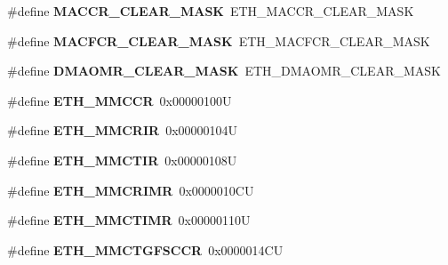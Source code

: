 \begin{DoxyCompactItemize}
\#define {\bfseries M\+A\+C\+C\+R\+\_\+\+C\+L\+E\+A\+R\+\_\+\+M\+A\+SK}~E\+T\+H\+\_\+\+M\+A\+C\+C\+R\+\_\+\+C\+L\+E\+A\+R\+\_\+\+M\+A\+SK
\item 
\mbox{\label{group___h_a_l___e_t_h___aliased___defines_ga0fc15b5e25134974f3a371c17882e36d}} 
\#define {\bfseries M\+A\+C\+F\+C\+R\+\_\+\+C\+L\+E\+A\+R\+\_\+\+M\+A\+SK}~E\+T\+H\+\_\+\+M\+A\+C\+F\+C\+R\+\_\+\+C\+L\+E\+A\+R\+\_\+\+M\+A\+SK
\item 
\mbox{\label{group___h_a_l___e_t_h___aliased___defines_gad1b188dfe2cdaea68fb36806a0b94b95}} 
\#define {\bfseries D\+M\+A\+O\+M\+R\+\_\+\+C\+L\+E\+A\+R\+\_\+\+M\+A\+SK}~E\+T\+H\+\_\+\+D\+M\+A\+O\+M\+R\+\_\+\+C\+L\+E\+A\+R\+\_\+\+M\+A\+SK
\item 
\mbox{\label{group___h_a_l___e_t_h___aliased___defines_ga340605767fdf406c393f046be44a1e09}} 
\#define {\bfseries E\+T\+H\+\_\+\+M\+M\+C\+CR}~0x00000100U
\item 
\mbox{\label{group___h_a_l___e_t_h___aliased___defines_gaa49af339607e5c30c69d55f4941fd775}} 
\#define {\bfseries E\+T\+H\+\_\+\+M\+M\+C\+R\+IR}~0x00000104U
\item 
\mbox{\label{group___h_a_l___e_t_h___aliased___defines_gab53a2a3649b1b96533c3bb8f2dfca221}} 
\#define {\bfseries E\+T\+H\+\_\+\+M\+M\+C\+T\+IR}~0x00000108U
\item 
\mbox{\label{group___h_a_l___e_t_h___aliased___defines_ga42e63a205698925c20f69be3d711ae59}} 
\#define {\bfseries E\+T\+H\+\_\+\+M\+M\+C\+R\+I\+MR}~0x0000010\+CU
\item 
\mbox{\label{group___h_a_l___e_t_h___aliased___defines_gad0e2ddcc50c96772130c9717aa1ec496}} 
\#define {\bfseries E\+T\+H\+\_\+\+M\+M\+C\+T\+I\+MR}~0x00000110U
\item 
\mbox{\label{group___h_a_l___e_t_h___aliased___defines_ga355a8ef08cc4a431601016a076ae9562}} 
\#define {\bfseries E\+T\+H\+\_\+\+M\+M\+C\+T\+G\+F\+S\+C\+CR}~0x0000014\+CU

\end{DoxyCompactItemize}
